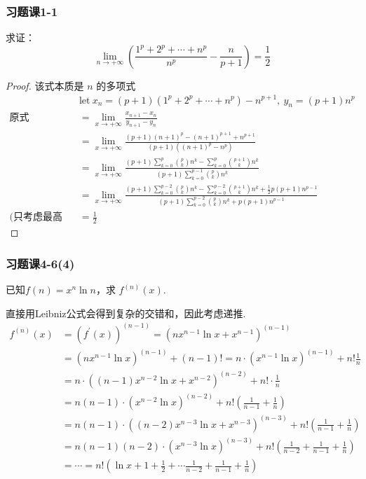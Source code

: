 \documentclass[./main.tex]{subfiles}
\begin{document}
\subsubsection{习题课1-1}
\noindent 求证：
\begin{equation}
  \lim\limits_{n\rightarrow +\infty}(\frac{1^p+2^p+\cdots+n^p}{n^p}-\frac{n}{p+1})=\frac{1}{2}
\end{equation}

\begin{proof}{该式本质是 $n$ 的多项式}
\begin{align*}
  &\text{let}\ x_n=(p+1)(1^p+2^p+\cdots+n^p)-n^{p+1} ,\ y_n=(p+1)n^p \\
  \text{原式}&=\lim\limits_{x\rightarrow +\infty}\frac{x_{n+1}-x_n}{y_{n+1}-y_n}\\
  &=\lim\limits_{x\rightarrow +\infty}\frac{(p+1)(n+1)^{p}-(n+1)^{p+1}+n^{p+1}}{(p+1)((n+1)^p-n^p)}\\
  &=\lim\limits_{x\rightarrow +\infty}\frac{(p+1)\sum\limits_{k=0}^p\binom{p}{k}n^k-\sum\limits_{k=0}^{p}\binom{p+1}{k}n^k}{(p+1)\sum\limits_{k=0}^{p-1}\binom{p}{k}n^k}\\
  &=\lim\limits_{x\rightarrow +\infty}\frac{(p+1)\sum\limits_{k=0}^{p-2}\binom{p}{k}n^k-\sum\limits_{k=0}^{p-2}\binom{p+1}{k}n^k+\frac{1}{2}p(p+1)n^{p-1}}{(p+1)\sum\limits_{k=0}^{p-2}\binom{p}{k}n^k+p(p+1)n^{p-1}} \\
 \text{(只考虑最高次项)}\ &=\frac{1}{2}
\end{align*}
\end{proof}

\subsubsection{习题课4-6(4)}
\noindent 已知$f(n)=x^n\ln n$，求 $f^{(n)}(x)$. \\
\begin{solution}
  直接用Leibniz公式会得到复杂的交错和，因此考虑递推.
\begin{align*}
  f^{(n)}(x)&=\left(f^{\prime}(x)\right)^{(n-1)}=\left(n x^{n-1} \ln x+x^{n-1}\right)^{(n-1)} \\
  &=\left(n x^{n-1} \ln x\right)^{(n-1)}+(n-1) !=n \cdot\left(x^{n-1} \ln x\right)^{(n-1)}+n ! \frac{1}{n} \\
  &=n \cdot\left((n-1) x^{n-2} \ln x+x^{n-2}\right)^{(n-2)}+n ! \cdot \frac{1}{n} \\
  &=n(n-1) \cdot\left(x^{n-2} \ln x\right)^{(n-2)}+n !\left(\frac{1}{n-1}+\frac{1}{n}\right) \\
  &=n(n-1) \cdot\left((n-2) x^{n-3} \ln x+x^{n-3}\right)^{(n-3)}+n !\left(\frac{1}{n-1}+\frac{1}{n}\right) \\
  &=n(n-1)(n-2) \cdot\left(x^{n-3} \ln x\right)^{(n-3)}+n !\left(\frac{1}{n-2}+\frac{1}{n-1}+\frac{1}{n}\right) \\
  &=\cdots=n !\left(\ln x+1+\frac{1}{2}+\cdots \frac{1}{n-2}+\frac{1}{n-1}+\frac{1}{n}\right)
\end{align*}
\end{solution}
\end{document}
